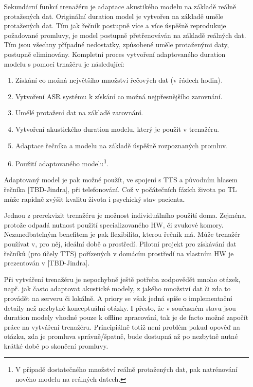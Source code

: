Sekundární funkcí trenažéru je adaptace akustikého modelu na základě reálně protažených dat. Originální duration model je vytvořen na základě uměle protažených dat. Tím jak řečník postupně více a více úspěšně reprodukuje požadované promluvy, je model postupně přetřenováván na základě reálných dat. Tím jsou všechny případné nedostatky, způsobené uměle protaženými daty, postupně eliminovány. Kompletní proces vytvoření adaptovaného duration modelu s pomocí trnažéru je následující:

\begin{enumerate}
  \item Získání co možná největšího množství řečových dat (v řádech hodin).
  \item Vytvoření ASR systému k získání co možná nejpřesnějšího zarovnání.
  \item Umělé protažení dat na základě zarovnání.
  \item Vytvoření akustického duration modelu, který je použit v trenažéru.
  \item Adaptace řečníka a modelu na základě úspěšně rozpoznaných promluv.
  \item Použití adaptovaného modelu\footnote{V případě dostatečného množství reálně protažených dat, pak natrénování nového modelu na reálných datech.}.
\end{enumerate}

\noindent Adaptovaný model je pak možné použít, ve spojení s TTS a původním hlasem řečníka [TBD-Jindra], při telefonování. Což v počátečních fázích života po TL může rapidně zvýšit kvalitu života i psychický stav pacienta.

Jednou z prerekvizit trenažéru je možnost individuálního použití doma. Zejména, protože odpadá nutnost použití specializovaného HW, či zvukové komory. Nezanedbatelným benefitem je pak flexibilita, kterou řečník má. Může trenažér používat v, pro něj, ideální době a prostředí. Pilotní projekt pro získávání dat řečníků (pro účely TTS) pořízených v domácím prostředí na vlastním HW je prezentován v [TBD-Jindra].

Při vytváření trenažéru je  nepochybně ještě potřeba zodpovědět mnoho otázek,  např. jak často adaptovat akustické modely, z jakého množství dat či zda to provádět na serveru či lokálně. A priory se však jedná spíše o implementační detaily než nezbytné konceptuální otázky. I přesto, že v současném stavu jsou duration modely vhodné pouze k offline zpracování, tak je de facto možné započít práce na vytváření trenažéru. Principiálně totiž není problém pokud opověď na otázku, zda je promluva správně/špatně, bude dostupná až po nezbytně nutné krátké době po skončení promluvy.

